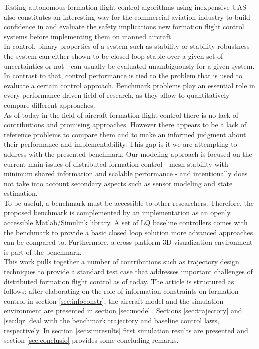 \documentclass{ifacconf}
\begin{document}
Testing autonomous formation flight control algorithms using inexpensive UAS also constitutes an interesting way for the commercial aviation industry to build confidence in and evaluate the safety implications new formation flight control systems before implementing them on manned aircraft.\\
In control, binary properties of a system such as stability or stability robustness - the system can either shown to be closed-loop stable over a given set of uncertainties or not - can usually be evaluated unambiguously for a given system. In contrast to that, control performance is tied to the problem that is used to evaluate a certain control approach. 
Benchmark problems play an essential role in every performance-driven field of research, as they allow to quantitatively compare different approaches. \\
As of today in the field of aircraft formation flight control there is no lack of contributions and promising approaches. However there appears to be a lack of reference problems to compare them and to make an informed judgment about their performance and implementability. This gap is it we are attempting to address with the presented benchmark. Our modeling approach is focused on the current main issues of distributed formation control - mesh stability with minimum shared information and scalable performance - and intentionally does not take into account secondary aspects such as sensor modeling and state estimation.\\
To be useful, a benchmark must be accessible to other researchers. Therefore, the proposed benchmark is complemented by an implementation as an openly accessible Matlab/Simulink library. A set of LQ baseline controllers comes with the benchmark to provide a basic closed loop solution more advanced approaches can be compared to.
Furthermore, a cross-platform 3D visualization environment is part of the benchmark. \\
This work pulls together a number of contributions such as trajectory design techniques to provide a standard test case that addresses important challenges of distributed formation flight control as of today.
The article is structured as follows: after elaborating on the role of information constraints on formation control in section \ref{sec:infoconstr}, the aircraft model and the simulation environment are presented in section \ref{sec:model}. Sections \ref{sec:trajectory} and \ref{sec:lqr} deal with the benchmark trajectory and baseline control laws, respectively. In section \ref{sec:simresults} first simulation results are presented and section \ref{sec:conclusio} provides some concluding remarks.
\end{document}
